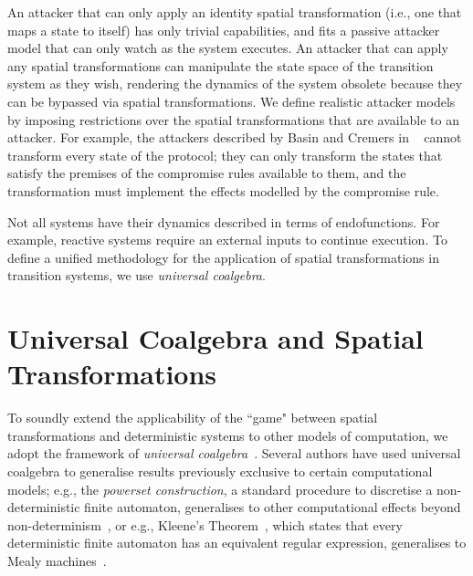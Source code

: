 An attacker that can only apply an identity spatial transformation (i.e., one that maps a state to itself) has only trivial capabilities, and fits a passive attacker model that can only watch as the system executes. An attacker that can apply any spatial transformations can manipulate the state space of the transition system as they wish, rendering the dynamics of the system obsolete because they can be bypassed via spatial transformations. We define realistic attacker models by imposing restrictions over the spatial transformations that are available to an attacker. %
For example, the attackers described by Basin and Cremers in ~\cite{KnowYourEnemy} cannot transform every state of the protocol; they can only transform the states that satisfy the premises of the
compromise rules available to them, and the transformation must implement the effects modelled by the compromise rule. %

Not all systems have their dynamics described in terms of endofunctions. For example, reactive systems require an external inputs to continue execution. To define a unified methodology for the application of spatial transformations in transition systems, we use \emph{universal coalgebra}.




\section{Universal Coalgebra and Spatial Transformations}
To soundly extend the applicability of the ``game" between spatial transformations and deterministic systems to other models of computation, we adopt the framework of \emph{universal coalgebra}~\cite{UniversalCoalgebra}.  
Several authors have used universal coalgebra to generalise results previously exclusive to certain computational models; e.g., the \emph{powerset construction}, a standard procedure to discretise a non-deterministic finite automaton, generalises to other computational effects beyond non-determinism~\cite{GeneralisingDetermination}, or e.g., Kleene's Theorem~\cite{KleenesTheorem}, which states that every deterministic finite automaton has an equivalent regular expression, generalises to Mealy machines~\cite{KleeneCoalgebra}.  

